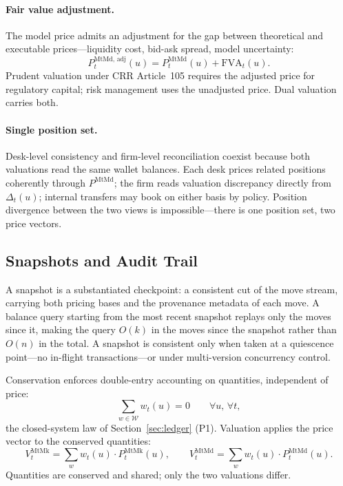 \paragraph{Fair value adjustment.} The model price admits an adjustment for the gap between theoretical and executable prices---liquidity cost, bid-ask spread, model uncertainty:
\[
P_t^{\text{MtMd, adj}}(u) = P_t^{\text{MtMd}}(u) + \text{FVA}_t(u).
\]
Prudent valuation under CRR Article~105 requires the adjusted price for regulatory capital; risk management uses the unadjusted price. Dual valuation carries both.

\paragraph{Single position set.} Desk-level consistency and firm-level reconciliation coexist because both valuations read the same wallet balances. Each desk prices related positions coherently through $P^{\text{MtMd}}$; the firm reads valuation discrepancy directly from $\Delta_t(u)$; internal transfers may book on either basis by policy. Position divergence between the two views is impossible---there is one position set, two price vectors.

\subsection{Snapshots and Audit Trail}
\label{subsec:snapshots}

A snapshot is a substantiated checkpoint: a consistent cut of the move stream, carrying both pricing bases and the provenance metadata of each move. A balance query starting from the most recent snapshot replays only the moves since it, making the query $O(k)$ in the moves since the snapshot rather than $O(n)$ in the total. A snapshot is consistent only when taken at a quiescence point---no in-flight transactions---or under multi-version concurrency control.

Conservation enforces double-entry accounting on quantities, independent of price:
\[
\sum_{w\in\mathcal{W}} w_t(u) = 0 \qquad \forall u,\,\forall t,
\]
the closed-system law of Section~\ref{sec:ledger} (P1). Valuation applies the price vector to the conserved quantities:
\[
V_t^{\text{MtMk}} = \sum_{w} w_t(u)\cdot P_t^{\text{MtMk}}(u), \qquad
V_t^{\text{MtMd}} = \sum_{w} w_t(u)\cdot P_t^{\text{MtMd}}(u).
\]
Quantities are conserved and shared; only the two valuations differ.
